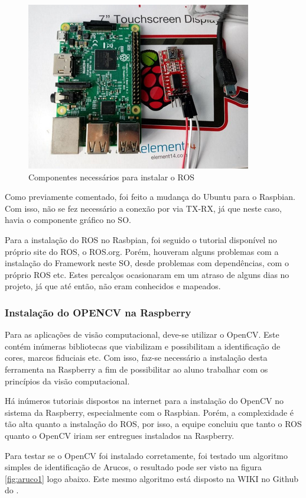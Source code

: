 \begin{figure}[H]
	\centering
	\includegraphics[scale=0.8, angle=0]{Figures/TX-RXconexao.png}
	\caption{Componentes necessários para instalar o ROS}
	\label{fig:txrx}
\end{figure}

Como previamente comentado, foi feito a mudança do Ubuntu para o Raspbian. Com isso, não se fez necessário a conexão por via TX-RX, já que neste caso, havia o componente gráfico no SO.

Para a instalação do ROS no Rasbpian, foi seguido o tutorial disponível no próprio site do ROS, o ROS.org. Porém, houveram alguns problemas com a instalação do Framework neste SO, desde problemas com dependências, com o próprio ROS etc. Estes percalços ocasionaram em um atraso de alguns dias no projeto, já que até então, não eram conhecidos e mapeados.

\subsubsection{Instalação do OPENCV na Raspberry}
Para as aplicações de visão computacional, deve-se utilizar o OpenCV. Este contém inúmeras bibliotecas que viabilizam e possibilitam a identificação de cores, marcos fiduciais etc. Com isso, faz-se necessário a instalação desta ferramenta na Raspberry a fim de possibilitar ao aluno trabalhar com os princípios da visão computacional.

Há inúmeros tutoriais dispostos na internet para a instalação do OpenCV no sistema da Raspberry, especialmente com o Raspbian. Porém, a complexidade é tão alta quanto a instalação do ROS, por isso, a equipe concluiu que tanto o ROS quanto o OpenCV iriam ser entregues instalados na Raspberry.

Para testar se o OpenCV foi instalado corretamente, foi testado um algoritmo simples de identificação de Arucos, o resultado pode ser visto na figura \ref{fig:aruco1} logo abaixo. Este mesmo algoritmo está disposto na WIKI no Github do \cite{wikilearn}.

